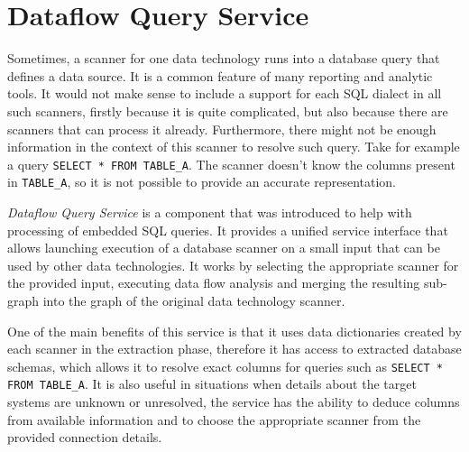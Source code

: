 \section{Dataflow Query Service}
\label{section:DQS}

Sometimes, a scanner for one data technology runs into a database query that defines a data source. It is a common feature of many reporting and analytic tools. It would not make sense to include a support for each SQL dialect in all such scanners, firstly because it is quite complicated, but also because there are scanners that can process it already. Furthermore, there might not be enough information in the context of this scanner to resolve such query. Take for example a query \texttt{SELECT * FROM TABLE\_A}. The scanner doesn't know the columns present in \texttt{TABLE\_A}, so it is not possible to provide an accurate representation. 
\par
\textit{Dataflow Query Service} is a component that was introduced to help with processing of embedded SQL queries. It provides a unified service interface that allows launching execution of a database scanner on a small input that can be used by other data technologies. It works by selecting the appropriate scanner for the provided input, executing data flow analysis and merging the resulting sub-graph into the graph of the original data technology scanner.
\par
One of the main benefits of this service is that it uses data dictionaries created by each scanner in the extraction phase, therefore it has access to extracted database schemas, which allows it to resolve exact columns for queries such as \texttt{SELECT * FROM TABLE\_A}. It is also useful in situations when details about the target systems are unknown or unresolved, the service has the ability to deduce columns from available information and to choose the appropriate scanner from the provided connection details.

